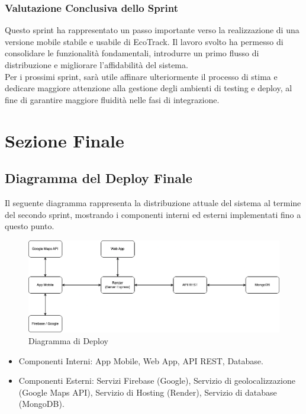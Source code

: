 \subsubsection{Valutazione Conclusiva dello Sprint}
Questo sprint ha rappresentato un passo importante verso la realizzazione di una versione mobile stabile e usabile di EcoTrack. Il lavoro svolto ha permesso di consolidare le funzionalità fondamentali, introdurre un primo flusso di distribuzione e migliorare l’affidabilità del sistema.\\
Per i prossimi sprint, sarà utile affinare ulteriormente il processo di stima e dedicare maggiore attenzione alla gestione degli ambienti di testing e deploy, al fine di garantire maggiore fluidità nelle fasi di integrazione.


\section{Sezione Finale}

\subsection{Diagramma del Deploy Finale}
Il seguente diagramma rappresenta la distribuzione attuale del sistema al termine del secondo sprint, mostrando i componenti interni ed esterni implementati fino a questo punto.
\vspace{1cm}
\begin{figure} [H]
    \centering
    \includegraphics[width=1\linewidth]{D4-G1/Img/Diagramma Deploy.png}
    \caption{Diagramma di Deploy}
    \label{fig:enter-label}
\end{figure}
\begin{itemize}
    \item Componenti Interni: App Mobile, Web App, API REST, Database.
    \item Componenti Esterni: Servizi Firebase (Google), Servizio di geolocalizzazione (Google Maps API), Servizio di Hosting (Render), Servizio di database (MongoDB).
\end{itemize}

